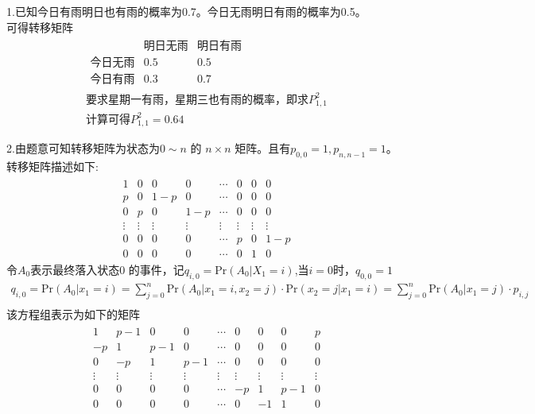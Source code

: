 \documentclass{article}
\begin{document}
    1.已知今日有雨明日也有雨的概率为0.7。今日无雨明日有雨的概率为0.5。\\
    可得转移矩阵
    \begin{gather*}
        \begin{matrix}
                    & \text{明日无雨} & \text{明日有雨}\\
            \text{今日无雨} & 0.5 & 0.5\\
            \text{今日有雨} &0.3 & 0.7    
        \end{matrix}
        \\
        \text{要求星期一有雨，星期三也有雨的概率，即求} P_{1,1}^{2}\\
        \text{计算可得} P_{1,1}^{2} = 0.64
    \end{gather*}


    2.由题意可知转移矩阵为状态为$0 \sim n$ 的 $n \times n$ 矩阵。且有$p_{0,0} = 1,p_{n, n-1} = 1$。转移矩阵描述如下:\\
    \begin{gather*}
        \begin{matrix}
            1 & 0   & 0   & 0   & \cdots & 0  & 0 & 0 \\
            p & 0   & 1-p & 0   & \cdots & 0  & 0 & 0 \\
            0 & p   & 0   & 1-p & \cdots & 0  & 0 & 0  \\
            \vdots & \vdots & \vdots & \vdots & \vdots & \vdots & \vdots & \vdots\\
            0 & 0   & 0   & 0   &  \cdots & p & 0 & 1-p \\
            0 & 0   & 0   & 0   &  \cdots & 0 & 1 & 0
        \end{matrix}
    \end{gather*}
    令$A_0$表示最终落入状态0 的事件，记$q_{i,0} = \mathrm{Pr}(A_0|X_1 = i)$,当$i=0$时，$q_{0,0} = 1$\\
    \begin{gather*}
        q_{i,0} = \mathrm{Pr}(A_0|x_1 = i) 
        = \sum_{j=0}^{n} \mathrm{Pr}(A_0 | x_1 = i, x_2 = j) \cdot \mathrm{Pr}(x_2 =j|x_1=i)
        = \sum_{j=0}^{n} \mathrm{Pr}(A_0 | x_1 = j) \cdot p_{i,j}\\
    \end{gather*}
    该方程组表示为如下的矩阵\\
    \begin{gather*}
        \begin{matrix}
            1  & p-1 & 0   & 0   & \cdots & 0  & 0  & 0 & p \\
            -p & 1   & p-1 & 0   & \cdots & 0  & 0  & 0 & 0 \\
            0  & -p  & 1   & p-1 & \cdots & 0  & 0  & 0 & 0  \\
            \vdots & \vdots & \vdots & \vdots & \vdots & \vdots & \vdots & \vdots & \vdots\\
            0 & 0   & 0   & 0   &  \cdots & -p & 1  & p-1 & 0 \\
            0 & 0   & 0   & 0   &  \cdots & 0  & -1 & 1 & 0
        \end{matrix}
    \end{gather*}
\end{document}

